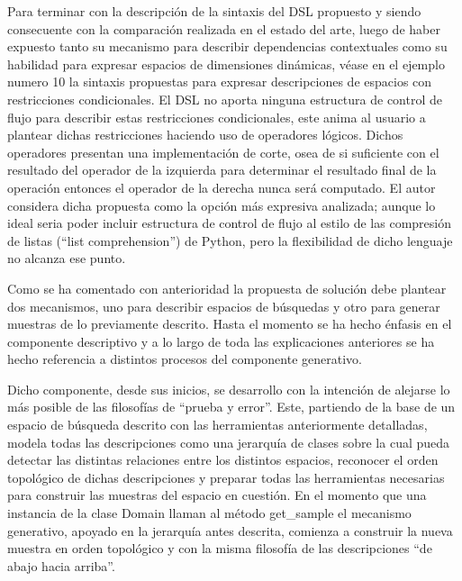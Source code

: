 Para terminar con la descripción de la sintaxis del DSL propuesto y siendo consecuente con la comparación realizada
en el estado del arte, luego de haber expuesto tanto su mecanismo para describir dependencias contextuales como su
habilidad para expresar espacios de dimensiones dinámicas, véase en el ejemplo numero 10 la sintaxis propuestas para
expresar descripciones de espacios con restricciones condicionales. El DSL no aporta ninguna estructura de control
de flujo para describir estas restricciones condicionales, este anima al usuario a plantear dichas restricciones
haciendo uso de operadores lógicos. Dichos operadores presentan una implementación de corte, osea de si suficiente
con el resultado del operador de la izquierda para determinar el resultado final de la operación entonces el operador
de la derecha nunca será computado. El autor considera dicha propuesta como la opción más expresiva analizada; aunque
lo ideal seria poder incluir estructura de control de flujo al estilo de las compresión de listas  (“list comprehension”)
de Python, pero la flexibilidad de dicho lenguaje no alcanza ese punto.

Como se ha comentado con anterioridad la propuesta de solución debe plantear dos mecanismos, uno para describir espacios
de búsquedas y otro para generar muestras de lo previamente descrito. Hasta el momento se ha hecho énfasis en el componente
descriptivo y a lo largo de toda las explicaciones anteriores se ha hecho referencia a distintos procesos del componente generativo.

Dicho componente, desde sus inicios, se desarrollo con la intención de alejarse lo más posible de las filosofías de
“prueba y error”. Este, partiendo de la base de un espacio de búsqueda descrito con las herramientas anteriormente
detalladas, modela todas las descripciones como una jerarquía de clases sobre la cual pueda detectar las distintas
relaciones entre los distintos espacios, reconocer el orden topológico de dichas descripciones y preparar todas las
herramientas necesarias para construir las muestras del espacio en cuestión. En el momento que una instancia de la
clase Domain llaman al método get\_sample el mecanismo generativo, apoyado en la jerarquía antes descrita, comienza
a construir la nueva muestra en orden topológico y con la misma filosofía de las descripciones “de abajo hacia arriba”.

